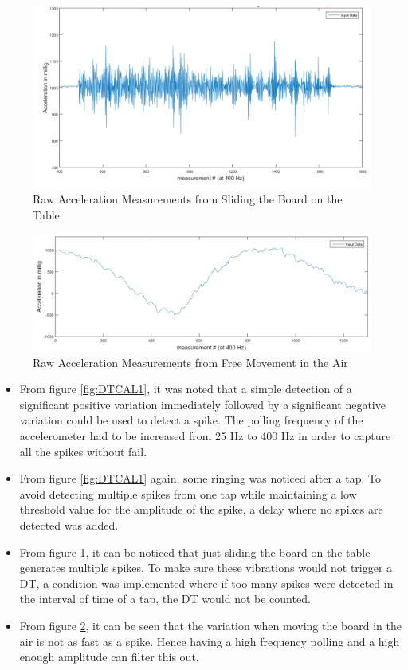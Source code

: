 \documentclass[12pt]{article}
\begin{document}
\begin{figure}[!htb]
 \centering
 \includegraphics[scale=0.45]{images/DTcalibration2.png}
 \caption{Raw Acceleration Measurements from Sliding the Board on the Table}
 \label{fig:DTCAL2}
\end{figure}

\begin{figure}[!htb]
 \centering
 \includegraphics[scale=0.45]{images/DTcalibration3.png}
 \caption{Raw Acceleration Measurements from Free Movement in the Air}
 \label{fig:DTCAL3}
\end{figure}

\begin{itemize}
\item From figure \ref{fig:DTCAL1}, it was noted that a simple detection of a significant positive variation immediately followed by a significant negative variation could be used to detect a spike. The polling frequency of the accelerometer had to be increased from 25 Hz to 400 Hz in order to capture all the spikes without fail.
\item From figure \ref{fig:DTCAL1} again, some ringing was noticed after a tap. To avoid detecting multiple spikes from one tap while maintaining a low threshold value for the amplitude of the spike, a delay where no spikes are detected was added.
\item From figure \ref{fig:DTCAL2}, it can be noticed that just sliding the board on the table generates multiple spikes. To make sure these vibrations would not trigger a DT, a condition was implemented where if too many spikes were detected in the interval of time of a tap, the DT would not be counted.
\item From figure \ref{fig:DTCAL3}, it can be seen that the variation when moving the board in the air is not as fast as a spike. Hence having a high frequency polling and a high enough amplitude can filter this out.

\end{itemize}
\end{document}
